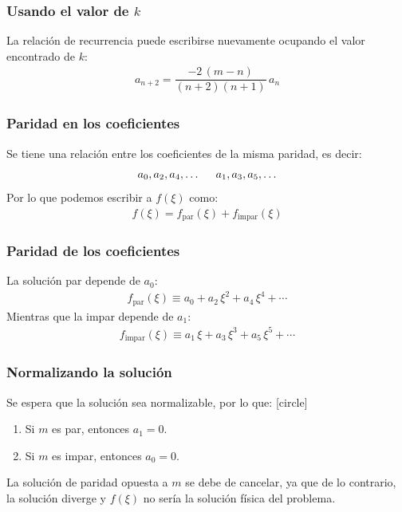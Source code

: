 \documentclass[12pt]{beamer}
\begin{document}
\begin{frame}
\frametitle{Usando el valor de $k$}
La relación de recurrencia puede escribirse nuevamente ocupando el valor encontrado de $k$:
\pause
\begin{align*}
a_{n+2} = \dfrac{-2 \, (m {-} n)}{(n {+} 2)(n {+} 1)} \, a_{n}
\end{align*}
\end{frame}
\begin{frame}
\frametitle{Paridad en los coeficientes}
Se tiene una relación entre los coeficientes de la misma paridad, es decir:
\begin{align*}
a_{0}, a_{2}, a_{4}, \ldots \hspace{0.5cm}
a_{1}, a_{3}, a_{5}, \ldots
\end{align*}
\pause
Por lo que podemos escribir a $f(\xi)$ como:
\pause
\begin{align*}
f(\xi) = f_{\mbox{par}} (\xi) + f_{\mbox{impar}} (\xi)
\end{align*}
\end{frame}
\begin{frame}
\frametitle{Paridad de los coeficientes}
La solución par depende de $a_{0}$:
\pause
\begin{align*}
f_{\mbox{par}} (\xi) \equiv a_{0} + a_{2} \, \xi^{2} + a_{4} \, \xi^{4} + \cdots
\end{align*}
\pause
Mientras que la impar depende de $a_{1}$:
\pause
\begin{align*}
f_{\mbox{impar}} (\xi) \equiv a_{1} \, \xi + a_{3} \, \xi^{3} + a_{5} \, \xi^{5} + \cdots
\end{align*}
\end{frame}
\begin{frame}
\frametitle{Normalizando la solución}
Se espera que la solución sea normalizable, por lo que:
[circle]
\begin{enumerate}[<+->]
\item Si $m$ es par, entonces $a_{1} = 0$.
\item Si $m$ es impar, entonces $a_{0} = 0$.
\end{enumerate}
\pause
La solución de paridad opuesta a $m$ se debe de cancelar, ya que de lo contrario, la solución diverge y $f(\xi)$ no sería la solución física del problema.
\end{frame}
\end{document}
